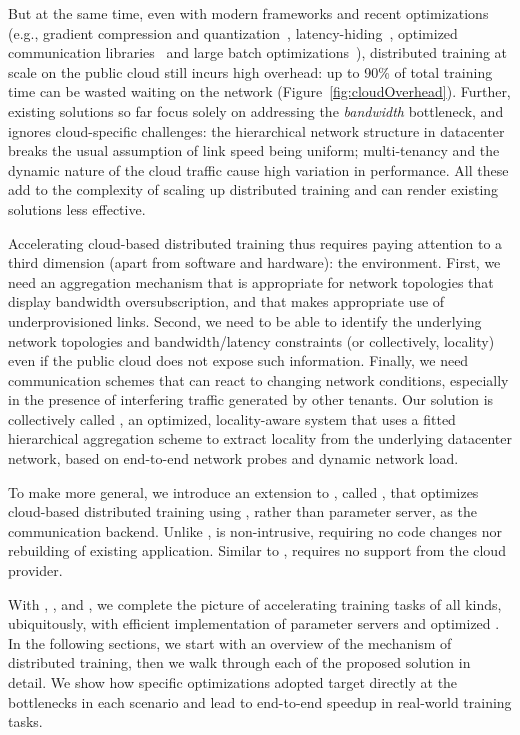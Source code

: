 But at the same time, even with modern frameworks and recent optimizations 
(e.g., gradient compression and quantization~\cite{lin2017deep, cntk1bt, lim20183lc}, latency-hiding~\cite{poseidon, jayarajan2019priority,hashemi2018tictac}, optimized communication libraries~\cite{facebook35:online, Operatio73:online, dmlcpsli50:online} and large batch optimizations~\cite{ImageNetIn1Hour}), distributed training at scale on the public cloud still incurs high overhead: up to 90\% of total training time can be wasted waiting on the network (Figure~\ref{fig:cloudOverhead}). Further, existing solutions so far focus solely on addressing the \textit{bandwidth} bottleneck, and ignores cloud-specific challenges: the hierarchical network structure in datacenter breaks the usual assumption of link speed being uniform; multi-tenancy and the dynamic nature of the cloud traffic cause high variation in performance. All these add to the complexity of scaling up distributed training and can render existing solutions less effective. 

Accelerating cloud-based distributed training thus requires paying attention to a third dimension (apart from software and hardware): the environment. First, we need an aggregation mechanism that is appropriate for network topologies that display bandwidth oversubscription, and that makes appropriate use of underprovisioned links.  Second, we need to be able to identify the underlying network topologies and bandwidth/latency constraints (or collectively, locality) even if the public cloud does not expose such information.  Finally, we need communication schemes that can react to changing network conditions, especially in the presence of interfering traffic generated by other tenants. Our solution is collectively called \plink, an optimized, locality-aware system that uses a fitted hierarchical aggregation scheme to extract locality from the underlying datacenter network, based on end-to-end network probes and dynamic network load. 

To make \plink more general, we introduce an extension to \plink, called \cmpi, that optimizes cloud-based distributed training using \collectives, rather than parameter server, as the communication backend. Unlike \plink, \cmpi is non-intrusive, requiring no code changes nor rebuilding of existing application. Similar to \plink, \cmpi requires no support from the cloud provider.

With \pbox, \phub, \plink and \cmpi, we complete the picture of accelerating training tasks of all kinds, ubiquitously, with efficient implementation of parameter servers and optimized \collectives. In the following sections, we start with an overview of the mechanism of distributed training, then we walk through each of the proposed solution in detail. We show how specific optimizations adopted target directly at the bottlenecks in each scenario and lead to end-to-end speedup in real-world training tasks.